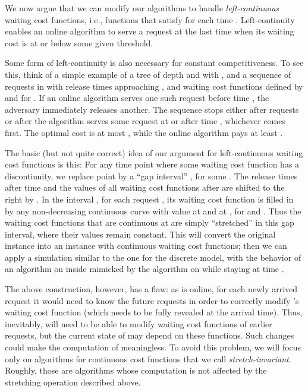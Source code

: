 \documentclass[a4paper]{article}
\begin{document}
We now argue that we can modify our algorithms to handle
\emph{left-continuous} waiting cost functions, i.e., functions that
satisfy 
for each time .  Left-continuity enables an online algorithm
to serve a request at the last time when its waiting cost is at or
below some given threshold.

Some form of left-continuity is also necessary for constant
competitiveness.  To see this, think of a simple example of a tree of
depth  and with , and a sequence of requests in  with release times
approaching , and waiting cost functions defined by
 and  for . If
an online algorithm serves one such request before time , the
adversary immediately releases another. The sequence stops either
after  requests or after the algorithm serves some
request at or after time , whichever comes first. 
The optimal cost is at most ,
while the online algorithm pays at least .

The basic (but not quite correct) idea of our argument for left-continuous waiting
cost functions is this:
For any time point  where some waiting cost function has a discontinuity,
we replace point  by a ``gap interval'' , for some . 
The release times after time  and the values of all
waiting cost functions after  are shifted to the right by .
In the interval , for each request , its waiting
cost function is filled in by any non-decreasing continuous curve with value
 at  and  at , for 
and .
Thus the waiting cost functions that are continuous at  are simply
``stretched'' in this gap interval, where their values remain constant.
This will convert the original instance  into an instance
 with continuous waiting cost functions; then we can apply
a simulation similar to the one for the discrete model, with the
behavior of an algorithm  on  inside  mimicked
by the algorithm  on  while staying at time .

The above construction, however, has a flaw: as  is online, for each
newly arrived request  it would need to know the future requests
in order to correctly modify 's waiting cost function (which needs
to be fully revealed at the arrival time). Thus, inevitably,  will
need to be able to modify waiting cost functions of earlier
requests, but the current state of  may depend on these functions.
Such changes could make the computation of  meaningless. 
To avoid this problem, we
will focus only on algorithms  for continuous cost functions that
we call \emph{stretch-invariant}. Roughly, those are algorithms whose
computation is not affected by the stretching operation described above.
\end{document}
